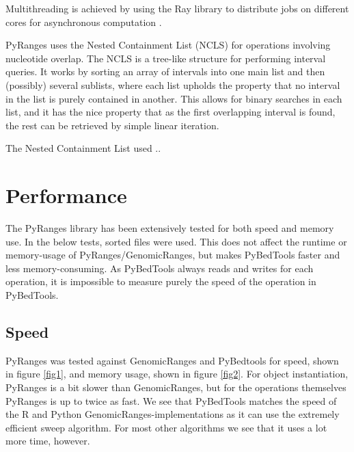 \documentclass[10pt,letterpaper]{article}
\begin{document}
Multithreading is achieved by using the Ray library to distribute jobs on
different cores for asynchronous computation \cite{}.

PyRanges uses the Nested Containment
List\cite{doi:10.1093/bioinformatics/btl647} (NCLS) for operations involving
nucleotide overlap. The NCLS is a tree-like structure for performing interval
queries. It works by sorting an array of intervals into one main list and then
(possibly) several sublists, where each list upholds the property that no
interval in the list is purely contained in another. This allows for binary
searches in each list, and it has the nice property that as the first
overlapping interval is found, the rest can be retrieved by simple linear
iteration.

The Nested Containment List used ..

\section*{Performance}

The PyRanges library has been extensively tested for both speed and memory use.
In the below tests, sorted files were used. This does not affect the runtime or
memory-usage of PyRanges/GenomicRanges, but makes PyBedTools faster and less
memory-consuming. As PyBedTools always reads and writes for each operation, it
is impossible to measure purely the speed of the operation in PyBedTools.

\subsection*{Speed}

PyRanges was tested against GenomicRanges and PyBedtools for speed, shown in
figure \ref{fig1}, and memory usage, shown in figure \ref{fig2}. For object
instantiation, PyRanges is a bit slower than GenomicRanges, but for the
operations themselves PyRanges is up to twice as fast. We see that PyBedTools
matches the speed of the R and Python GenomicRanges-implementations as it can
use the extremely efficient sweep algorithm. For most other algorithms we see
that it uses a lot more time, however.

\end{document}
